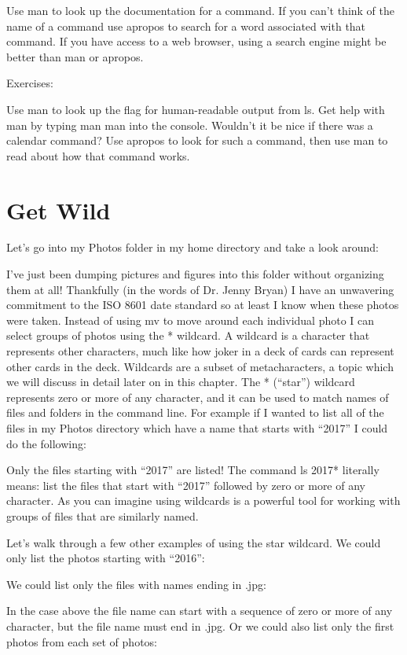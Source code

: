 Use man to look up the documentation for a command.
If you can’t think of the name of a command use apropos to search for a word associated with that command.
If you have access to a web browser, using a search engine might be better than man or apropos.

Exercises:

    Use man to look up the flag for human-readable output from ls.
Get help with man by typing man man into the console.
Wouldn’t it be nice if there was a calendar command? Use apropos to look for such a command, then use man to read about how that command works.


\section{Get Wild}
Let’s go into my Photos folder in my home directory and take a look around:

I’ve just been dumping pictures and figures into this folder without organizing them at all! Thankfully (in the words of Dr. Jenny Bryan) I have an unwavering commitment to the ISO 8601 date standard so at least I know when these photos were taken. Instead of using mv to move around each individual photo I can select groups of photos using the * wildcard. A wildcard is a character that represents other characters, much like how joker in a deck of cards can represent other cards in the deck. Wildcards are a subset of metacharacters, a topic which we will discuss in detail later on in this chapter. The * (“star”) wildcard represents zero or more of any character, and it can be used to match names of files and folders in the command line. For example if I wanted to list all of the files in my Photos directory which have a name that starts with “2017” I could do the following:

Only the files starting with “2017” are listed! The command ls 2017* literally means: list the files that start with “2017” followed by zero or more of any character. As you can imagine using wildcards is a powerful tool for working with groups of files that are similarly named.

Let’s walk through a few other examples of using the star wildcard. We could only list the photos starting with “2016”:

We could list only the files with names ending in .jpg:

In the case above the file name can start with a sequence of zero or more of any character, but the file name must end in .jpg. Or we could also list only the first photos from each set of photos:

